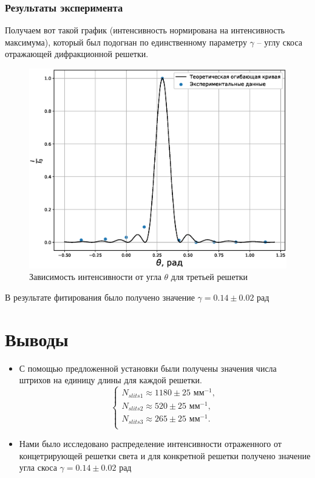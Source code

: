 \documentclass[a4paper,14pt]{extarticle}
\begin{document}
			\subsubsection{Результаты эксперимента}
			Получаем вот такой график (интенсивность нормирована на интенсивность максимума), который был подогнан по единственному параметру $\gamma$ -- углу скоса отражающей дифракционной решетки.
			
			\newpage
			
			\begin{figure}[h!]
				\centering
				\includegraphics[width=1\linewidth]{Fraun4.eps}
				\caption{Зависимость интенсивности от угла $\theta$ для третьей решетки}
				\label{fig6}
			\end{figure}
			
			В результате фитирования было получено значение $\gamma = 0.14 \pm 0.02$ рад
	\section{Выводы}
		\begin{itemize}
			\item С помощью предложенной установки были получены значения числа штрихов на единицу длины для каждой решетки. 
			\begin{equation}
				\begin{cases}
					N_{slits 1} \approx 1180 \pm 25 \text{ мм}^{-1}, \\
					N_{slits 2} \approx 520 \pm 25 \text{ мм}^{-1}, \\
					N_{slits 3} \approx 265 \pm 25 \text{ мм}^{-1}. \\
				\end{cases}
			\end{equation}
			\item Нами было исследовано распределение интенсивности отраженного от концетрирующей решетки света и для конкретной решетки получено значение угла скоса $\gamma = 0.14 \pm 0.02$ рад
		\end{itemize}
\end{document}
